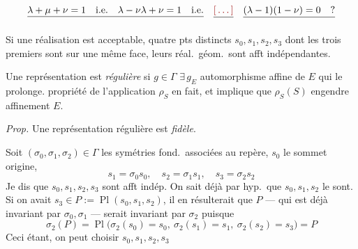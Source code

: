 \documentclass[11pt,a4paper]{article}
\begin{document}
 \struck{\ill{}}        \ill{}
\[
\struck{\lambda + \mu + \nu = 1 \quad\text{i.e.}\quad \lambda - \nu\lambda + \nu = 1 \quad\text{i.e.}} \quad \struck{\ill{}}\quad \struck{(\lambda - 1)(1 - \nu) = 0 \quad ?}
\]

Si une réalisation est acceptable,  quatre pts distincts $s_0, s_1, s_2, s_3$ dont les trois premiers sont sur une même face, leurs réal.\ géom.\ sont afft indépendantes.

 Une représentation est   \emph{régulière} si   $g \in \Gamma$ $\exists\, g_E$ automorphisme affine de $E$ qui le prolonge.    propriété de l'application $\rho_S$ en fait, et implique que $\rho_S(S)$ engendre affinement $E$.


\emph{Prop.} Une représentation régulière est \emph{fidèle}.

Soit  $(\sigma_0, \sigma_1, \sigma_2) \in \Gamma$ les symétries fond.\ associées au repère, $s_0$ le sommet origine,
\[
s_1 = \sigma_0 s_0, \quad s_2 = \sigma_1 s_1, \quad s_3 = \sigma_2 s_2
\]
 Je dis que $s_0, s_1, s_2, s_3$ sont afft indép. On sait déjà par hyp.\ que $s_0, s_1, s_2$ le sont. Si on avait $s_3 \in P := \operatorname{Pl}(s_0, s_1, s_2)$, il en résulterait que $P$ — qui est déjà invariant par $\sigma_0, \sigma_1$ — serait invariant par $\sigma_2$  puisque
\[
\sigma_2(P) = \operatorname{Pl}\bigl(\sigma_2(s_0) = s_0,\ \sigma_2(s_1) = s_1,\ \sigma_2(s_2) = s_3\bigr) = P
\]
Ceci étant, on peut \struck{\ill{}} choisir $s_0, s_1, s_2, s_3$
\end{document}
